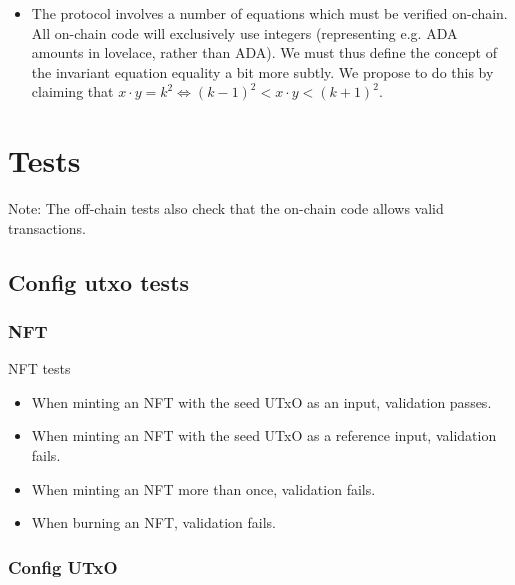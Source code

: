 \documentclass{article}
\begin{document}
\begin{itemize}
  \item The protocol involves a number of equations which must be verified
    on-chain. All on-chain code will exclusively use integers (representing e.g.
    ADA amounts in lovelace, rather than ADA). We must thus define the concept
    of the invariant equation equality a bit more subtly. We propose to do this
    by claiming that $x \cdot y = k^2 \Leftrightarrow (k-1)^2 < x \cdot y <
    (k+1)^2$.
\end{itemize}


\section{Tests}


Note: The off-chain tests also check that the on-chain code allows valid
transactions.


\subsection{Config utxo tests}

\subsubsection{NFT}


NFT tests

\begin{itemize}
	\item When minting an NFT with the seed UTxO as an input, validation passes.
	\item When minting an NFT with the seed UTxO as a reference input, validation fails.
	\item When minting an NFT more than once, validation fails.
	\item When burning an NFT, validation fails.
\end{itemize}

\subsubsection{Config UTxO}
\end{document}
